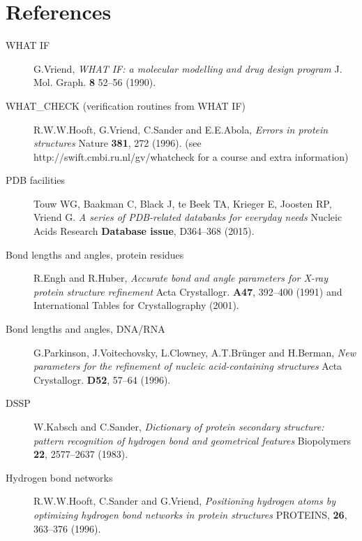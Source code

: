\documentclass[a4paper]{article}
\begin{document}
%
\appendix
\section{References}
\raggedright

\begin{description}

\item [WHAT IF]

G.Vriend,
{\em WHAT IF: a molecular modelling and drug design program\/}
J. Mol. Graph. {\bf 8} 52--56 (1990).

\item [WHAT\_CHECK (verification routines from WHAT IF)]

R.W.W.Hooft, G.Vriend, C.Sander and E.E.Abola,
{\em Errors in protein structures\/}
Nature {\bf 381}, 272 (1996).
(see http://swift.cmbi.ru.nl/gv/whatcheck for a course and extra information)

\item [PDB facilities]

Touw WG, Baakman C, Black J, te Beek TA, Krieger E, Joosten RP, Vriend G.
{\em A series of PDB-related databanks for everyday needs\/}
Nucleic Acids Research {\bf Database issue}, D364--368 (2015).

\item [Bond lengths and angles, protein residues]

R.Engh and R.Huber,
{\em Accurate bond and angle parameters for X-ray protein structure
     refinement\/}
Acta Crystallogr. {\bf A47}, 392--400 (1991) and
International Tables for Crystallography (2001).

\item [Bond lengths and angles, DNA/RNA]

G.Parkinson, J.Voitechovsky, L.Clowney, A.T.Br\"unger and H.Berman,
{\em New parameters for the refinement of nucleic acid-containing structures\/}
Acta Crystallogr. {\bf D52}, 57--64 (1996).

\item [DSSP]

W.Kabsch and C.Sander,
{\em Dictionary of protein secondary structure: pattern
     recognition of hydrogen bond and geometrical features\/}
Biopolymers {\bf 22}, 2577--2637 (1983).

\item [Hydrogen bond networks]

R.W.W.Hooft, C.Sander and G.Vriend,
{\em Positioning hydrogen atoms by optimizing hydrogen bond networks in
     protein structures\/}
PROTEINS, {\bf 26}, 363--376 (1996).


\end{description}
\end{document}

